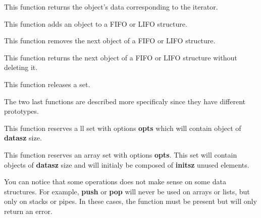 
This function returns the object's data corresponding to the iterator.


This function adds an object to a FIFO or LIFO structure.


This function removes the next object of a FIFO or LIFO structure.


This  function returns the  next object  of a  FIFO or  LIFO structure
without deleting it.


This function releases a set.

The two last functions are  described more specificaly since they have
different prototypes.


This function reserves a ll set with options \textbf{opts} which will contain
object of \textbf{datasz} size.


This function reserves an array set with options \textbf{opts}. This
set will contain objects of \textbf{datasz} size and will initialy
be composed of \textbf{initsz} unused elements.

You can notice  that some operations does not make  sense on some data
structures. For  example, \textbf{push} or \textbf{pop}  will never be
used on arrays or lists, but  only on stacks or pipes. In these cases,
the function must be present but will only return an error.

